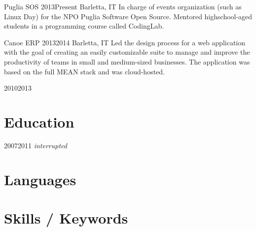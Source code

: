 \documentclass{resume}
\begin{document}
%
    {Puglia SOS}%
    {2013}{Present}%
    {Barletta, IT}%
    {In charge of events organization (such as Linux Day) for the NPO Puglia
        Software Open Source. Mentored highschool-aged students in a
        programming course called CodingLab.}

%
    {Canoe ERP}%
    {2013}{2014}%
    {Barletta, IT}%
    {Led the design process for a web application with the goal of creating an
        easily customizable suite to manage and improve the productivity of
        teams in small and medium-sized businesses.  The application was based
        on the full MEAN stack and was cloud-hosted.}

%
    {}%
    {2010}{2013}%
    {}{}

\section{Education}

%
    {2007}{2011 \lbrack \textit{interrupted}\rbrack}{}{}

\section{Languages}

\begin{languagessection}
\end{languagessection}

\section{Skills / Keywords}
\end{document}
